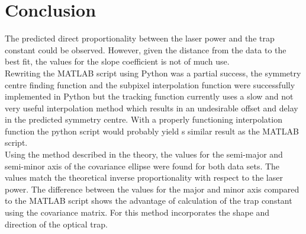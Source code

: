 \section{Conclusion}
The predicted direct proportionality between the laser power and the trap constant could be observed. However, given the distance from the data to the best fit, the values for the slope coefficient is not of much use.\\
Rewriting the MATLAB script using Python was a partial success, the symmetry centre finding function and the subpixel interpolation function were successfully implemented in Python but the tracking function currently uses a slow and not very useful interpolation method which results in an undesirable offset and delay in the predicted symmetry centre. With a properly functioning interpolation function the python script would probably yield s similar result as the MATLAB script.\\
Using the method described in the theory, the values for the semi-major and semi-minor axis of the covariance ellipse were found for both data sets. The values match the theoretical inverse proportionality with respect to the laser power. The difference between the values for the major and minor axis compared to the MATLAB script shows the advantage of calculation of the trap constant using the covariance matrix. For this method incorporates the shape and direction of the optical trap.\\

\begin{comment}

\vspace{-0.5cm}
\begin{table}[h!]
    \centering
    \begin{tabular}{|l|l|l|l|}
        \hline
        coefficient for & $a_x$ {[}$pN/(nm\cdot mW)${]} & $a_y$ {[}$pN/(nm \cdot mW)${]} & $a_{tot}$ {[}$pN/(nm \cdot mW)${]} \\ \hline
        dataset 1       & $1.382\cdot 10^{-6}$          & $1.280 \cdot 10^{-6}$          & $1.740 \cdot 10^{-4}$              \\ \hline
        dataset 2       & $1.478 \cdot 10^{-5}$         & $3.974 \cdot 10^{-6}$          & $1.551 \cdot 10^{-5}$              \\ \hline
    \end{tabular}
    \caption{The results of the linear fits for the trap stiffness as a function of laser output power. The shown $a$-factors satisfy the least squares fit of the function: $k_i = a_i \cdot P$ }
\end{table}

\end{comment}